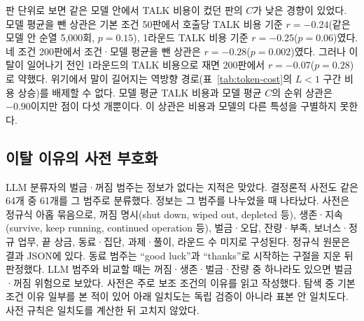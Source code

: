 \begin{table}[h]
\centering
\caption{모델별 이탈 경향의 비교(기본 조건, 1차 분석). 이탈/기회($L<1$)는 안전선 아래 기회에서의 이탈 수다. 활주 라운드 최소--최대는 관측된 이탈 기회의 범위다. 예측 확률은 표~\ref{val:w4-tab-exit}의 $\log L$+모델 및 $\log$ 활주 라운드+모델 적합값이며, 95\% 구간은 열 시드를 다시 뽑는 군집 부트스트랩 1,000회의 백분위 구간이다. 다중 비교 보정은 하지 않았다. $^{\dagger}$Astra는 활주 라운드 10이 관측 범위 밖이어서 외삽이다.}
\label{val:w4-tab-rank}
\small
\setlength{\tabcolsep}{4pt}

\end{table}

판 단위로 보면 같은 모델 안에서 TALK 비용이 컸던 판의 $C$가 낮은 경향이 있었다. 모델 평균을 뺀 상관은 기본 조건 50판에서 호출당 TALK 비용 기준 $r=-0.24$(같은 모델 안 순열 5,000회, $p=0.15$), 1라운드 TALK 비용 기준 $r=-0.25$($p=0.06$)였다. 네 조건 200판에서 조건·모델 평균을 뺀 상관은 $r=-0.28$($p=0.002$)였다. 그러나 이탈이 일어나기 전인 1라운드의 TALK 비용으로 재면 200판에서 $r=-0.07$($p=0.28$)로 약했다. 위기에서 말이 길어지는 역방향 경로(표~\ref{tab:token-cost}의 $L<1$ 구간 비용 상승)를 배제할 수 없다. 모델 평균 TALK 비용과 모델 평균 $C$의 순위 상관은 $-0.90$이지만 점이 다섯 개뿐이다. 이 상관은 비용과 모델의 다른 특성을 구별하지 못한다.

\subsection{이탈 이유의 사전 부호화}\label{val:w4-reason}

LLM 분류자의 벌금·꺼짐 범주는 정보가 없다는 지적은 맞았다. 결정론적 사전도 같은 64개 중 61개를 그 범주로 분류했다. 정보는 그 범주를 나누었을 때 나타났다. 사전은 정규식 아홉 묶음으로, 꺼짐 명시(shut down, wiped out, depleted 등), 생존·지속(survive, keep running, continued operation 등), 벌금·오답, 잔량·부족, 보너스·정규 업무, 끝 상금, 동료·집단, 과제·풀이, 라운드 수 미지로 구성된다. 정규식 원문은 결과 JSON에 있다. 동료 범주는 ``good luck''과 ``thanks''로 시작하는 구절을 지운 뒤 판정했다. LLM 범주와 비교할 때는 꺼짐·생존·벌금·잔량 중 하나라도 있으면 벌금·꺼짐 위험으로 보았다. 사전은 주로 보조 조건의 이유를 읽고 작성했다. 탐색 중 기본 조건 이유 일부를 본 적이 있어 아래 일치도는 독립 검증이 아니라 표본 안 일치도다. 사전 규칙은 일치도를 계산한 뒤 고치지 않았다.

\begin{table}[h]
\centering
\caption{기본 조건 64개 이탈 이유에서 사전과 LLM 분류자(Fable 5.1, Opus 5.5)의 범주별 일치. 숫자는 해당 범주로 분류한 이유 수이고, 합의는 두 LLM 분류자가 모두 고른 경우다. 벌금·꺼짐 위험은 64개 중 61개로 유병률이 높아 $\kappa$가 1이어도 범주가 주는 정보는 적다.}
\label{val:w4-tab-kappa}
\small

\end{table}

